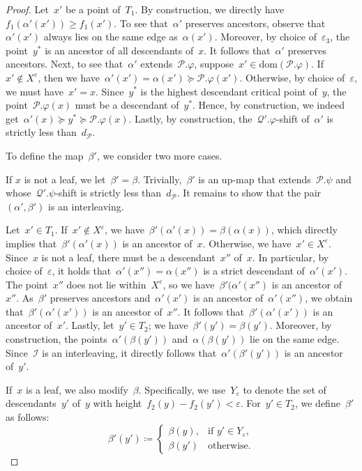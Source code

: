 \documentclass[a4paper,UKenglish, autoref, thm-restate, cleveref]{lipics-v2021}
\newcommand{\dom}{\mathrm{dom}}
\newcommand{\resdist}[1]{d_{#1}}
\newcommand{\eps}{\varepsilon}
\renewcommand{\phi}{\varphi}
\newcommand{\I}{\mathcal{I}}
\renewcommand{\P}{\mathcal{P}}
\newcommand{\Q}{\mathcal{Q}}
\begin{document}
\begin{proof}
    Let~$x'$ be a point of~$T_1$.
    By construction, we directly have~$f_1(\alpha'(x')) \ge f_1(x')$.
    To see that~$\alpha'$ preserves ancestors, observe that~$\alpha'(x')$ always lies on the same edge as~$\alpha(x')$.
    Moreover, by choice of~$\eps_3$, the point~$y^*$ is an ancestor of all descendants of~$x$.
    It follows that~$\alpha'$ preserves ancestors.
    Next, to see that~$\alpha'$ extends~$\P.\phi$, suppose~$x' \in \dom(\P.\phi)$.
    If~$x' \notin X^\eps$, then we have~$\alpha'(x') = \alpha(x') \succeq \P.\phi(x')$.
    Otherwise, by choice of~$\eps$, we must have~$x' = x$.
    Since~$y^*$ is the highest descendant critical point of~$y$, the point~$\P.\phi(x)$ must be a descendant of~$y^*$.
    Hence, by construction, we indeed get~$\alpha'(x) \succeq y^* \succeq \P.\phi(x)$.
    Lastly, by construction, the~$\Q'.\phi$-shift of~$\alpha'$ is strictly less than~$\resdist{\P}$. 

    To define the map~$\beta'$, we consider two more cases.
    
    If $x$ is not a leaf, we let~$\beta' = \beta$.
    Trivially,~$\beta'$ is an up-map that extends~$\P.\psi$ and whose~$\Q'.\psi$-shift is strictly less than~$\resdist{\P}$.
    It remains to show that the pair~$(\alpha', \beta')$ is an interleaving.

    Let~$x' \in T_1$.
    If~$x' \notin X^\eps$, we have~$\beta'(\alpha'(x)) = \beta(\alpha(x))$, which directly implies that~$\beta'(\alpha'(x))$ is an ancestor of~$x$.
    Otherwise, we have~$x' \in X^\eps$.
    Since~$x$ is not a leaf, there must be a descendant~$x''$ of~$x$.
    In particular, by choice of~$\eps$, it holds that~$\alpha'(x'') = \alpha(x'')$ is a strict descendant of~$\alpha'(x')$.
    The point~$x''$ does not lie within~$X^\eps$, so we have~$\beta'(\alpha'(x'')$ is an ancestor of~$x''$.
    As~$\beta'$ preserves ancestors and~$\alpha'(x')$ is an ancestor of~$\alpha'(x'')$, we obtain that~$\beta'(\alpha'(x'))$ is an ancestor of~$x''$.
    It follows that~$\beta'(\alpha'(x'))$ is an ancestor of~$x'$.
    Lastly, let~$y' \in T_2$; we have~$\beta'(y') = \beta(y')$.
    Moreover, by construction, the points~$\alpha'(\beta(y'))$ and~$\alpha(\beta(y'))$ lie on the same edge.
    Since~$\I$ is an interleaving, it directly follows that~$\alpha'(\beta'(y'))$ is an ancestor of~$y'$.
    
    If~$x$ is a leaf, we also modify~$\beta$.
    Specifically, we use~$Y_\eps$ to denote the set of descendants~$y'$ of~$y$ with height~$f_2(y) - f_2(y') < \eps$. 
    For~$y' \in T_2$, we define~$\beta'$ as follows:
    \[
        \beta'(y') \coloneqq \begin{cases}
            \beta(y), & \text{if } y' \in Y_\eps, \\
            \beta(y') & \text{otherwise.}
        \end{cases}
    \]


\end{proof}
\end{document}
